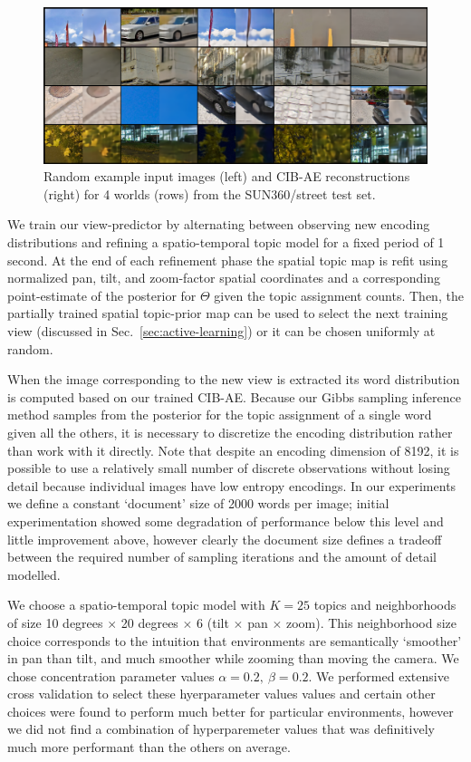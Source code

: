 \begin{figure}
    \centering
    \includegraphics[width=\textwidth]{figures/ptz/mc3ae_encodings}
    \caption{Random example input images (left) and CIB-AE reconstructions (right) for 4 worlds (rows) from the SUN360/street test set.}
    \label{fig:cibae_encodings}
\end{figure}

We train our view-predictor by alternating between observing new encoding distributions and refining a spatio-temporal topic model for a fixed period of 1 second. At the end of each refinement phase the spatial topic map is refit using normalized pan, tilt, and zoom-factor spatial coordinates and a corresponding point-estimate of the posterior for $\Theta$ given the topic assignment counts. Then, the partially trained spatial topic-prior map can be used to select the next training view (discussed in Sec.~\ref{sec:active-learning}) or it can be chosen uniformly at random.

When the image corresponding to the new view is extracted its word distribution is computed based on our trained CIB-AE. Because our Gibbs sampling inference method samples from the posterior for the topic assignment of a single word given all the others, it is necessary to discretize the encoding distribution rather than work with it directly. Note that despite an encoding dimension of 8192, it is possible to use a relatively small number of discrete observations without losing detail because individual images have low entropy encodings. In our experiments we define a constant `document' size of 2000 words per image; initial experimentation showed some degradation of performance below this level and little improvement above, however clearly the document size defines a tradeoff between the required number of sampling iterations and the amount of detail modelled.

We choose a spatio-temporal topic model with $K = 25$ topics and neighborhoods of size 10 degrees $\times$ 20 degrees $\times$ 6 (tilt $\times$ pan $\times$ zoom). This neighborhood size choice corresponds to the intuition that environments are semantically `smoother' in pan than tilt, and much smoother while zooming than moving the camera. We chose concentration parameter values $\alpha = 0.2,~\beta = 0.2$. We performed extensive cross validation to select these hyerparameter values values and certain other choices were found to perform much better for particular environments, however we did not find a combination of hyperparemeter values that was definitively much more performant than the others on average.

